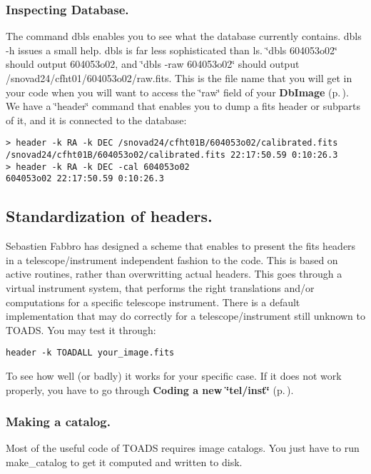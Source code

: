 \subsubsection{Inspecting Database.}\label{inspecting_database}
 The command dbls enables you to see what the database currently contains. dbls -h issues a small help. dbls is far less sophisticated than ls. \char`\"{}dbls 604053o02\char`\"{} should output 604053o02, and \char`\"{}dbls -raw 604053o02\char`\"{} should output /snovad24/cfht01/604053o02/raw.fits. This is the file name that you will get in your code when you will want to access the \char`\"{}raw\char`\"{} field of your {\bf Db\-Image} {\rm (p.\,\pageref{class_dbimage})}. We have a \char`\"{}header\char`\"{} command that enables you to dump a fits header or  subparts of it, and it is connected to the database: \footnotesize\begin{verbatim}> header -k RA -k DEC /snovad24/cfht01B/604053o02/calibrated.fits
/snovad24/cfht01B/604053o02/calibrated.fits 22:17:50.59 0:10:26.3
> header -k RA -k DEC -cal 604053o02
604053o02 22:17:50.59 0:10:26.3 \end{verbatim}\normalsize 


\subsection{Standardization of headers.}\label{fitstoad}
 Sebastien Fabbro has designed a scheme that enables to present the fits headers in a telescope/instrument independent fashion to the code. This is based  on active routines, rather than overwritting actual headers. This goes through a virtual instrument system, that performs the right translations and/or computations for a specific telescope instrument. There is a default implementation that may do correctly for a telescope/instrument still  unknown to TOADS. You may test it through: \footnotesize\begin{verbatim}header -k TOADALL your_image.fits\end{verbatim}\normalsize 
 To see how well (or badly) it works for your specific case. If it does  not work properly, you have to go through {\bf Coding a new \char`\"{}tel/inst\char`\"{}} {\rm (p.\,\pageref{newtelinst})}.

\subsubsection{Making a catalog.}\label{cataloging}
 Most of the useful code of TOADS requires image catalogs. You just have to run make\_\-catalog to get it computed and written to disk.

